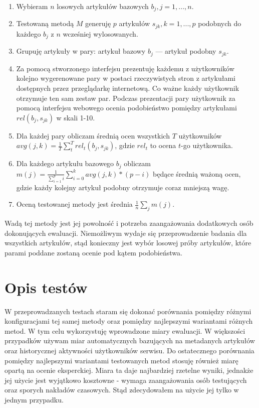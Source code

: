 \documentclass[pl]{minipw} %
\begin{document}
\begin{enumerate}
	\item Wybieram $n$ losowych artykułów bazowych $b_j, j=1,...,n$.
	\item  Testowaną metodą $M$ generuję $p$ artykułów $s_{jk}, k=1,...,p$ podobnych do każdego $b_j$ z $n$ wcześniej wylosowanych.
	\item Grupuję artykuły w pary: artykuł bazowy $b_j$ --- artykuł podobny $s_{jk}$.
	\item Za pomocą stworzonego interfejsu prezentuję każdemu z użytkowników kolejno wygerenowane pary w postaci rzeczywistych stron z artykułami dostępnych przez przeglądarkę internetową. Co ważne każdy użytkownik otrzymuje ten sam zestaw par. Podczas prezentacji pary użytkownik za pomocą interfejsu webowego ocenia podobieństwo pomiędzy artykułami $rel(b_j, s_{jk})$ w skali 1-10.
	\item Dla każdej pary obliczam średnią ocen wszystkich $T$ użytkowników $avg(j,k)=\frac{1}{T}\sum_{t}^{T}rel_t(b_j, s_{jk})$, gdzie $rel_t$ to ocena $t$-go użytkownika.
	\item Dla każdego artykułu bazowego $b_j$ obliczam $m(j) = \frac{1}{\sum_{i=1}^{p}i}\sum_{i=0}^{k} avg(j,k)*(p-i)$ będące średnią ważoną ocen, gdzie każdy kolejny artykuł podobny otrzymuje coraz mniejszą wagę.
	\item Oceną testowanej metody jest średnia $\frac{1}{n}\sum_{j}m(j)$.
\end{enumerate}

Wadą tej metody jest jej powolność i potrzeba zaangażowania dodatkowych osób dokonujących ewaluacji. Niemożliwym wydaje się przeprowadzenie badania dla wszystkich artykułów, stąd konieczny jest wybór losowej próby artykułów, które parami poddane zostaną ocenie pod kątem podobieństwa.


\chapter{Opis testów}

W przeprowadzanych testach staram się dokonać porównania pomiędzy różnymi konfiguracjami tej samej metody oraz pomiędzy najlepszymi wariantami różnych metod. W tym celu wykorzystuję wprowadzone miary ewaluacji. W większości przypadków używam miar automatycznych bazujących na metadanych artykułów oraz historycznej aktywności użytkowników serwisu. Do ostatecznego porównania pomiędzy najlepszymi wariantami testowanych metod stosuję również miarę opartą na ocenie eksperckiej. Miara ta daje najbardziej rzetelne wyniki, jednakże jej użycie jest wyjątkowo kosztowne - wymaga zaangażowania osób testujących oraz sporych nakładów czasowych. Stąd zdecydowałem na użycie jej tylko w jednym przypadku.
\end{document}

